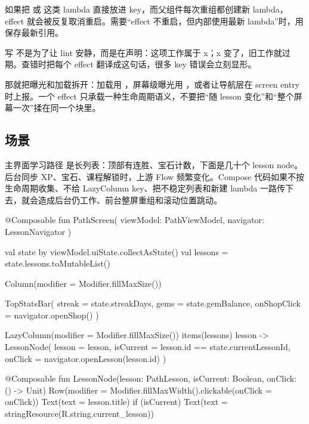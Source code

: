 \begin{pitfall}
如果把  或  这类 lambda 直接放进 key，而父组件每次重组都创建新 lambda，effect 就会被反复取消重启。需要“effect 不重启，但内部使用最新 lambda”时，用  保存最新引用。
\end{pitfall}

\begin{idea}
写  不是为了让 lint 安静，而是在声明：这项工作属于 x；x 变了，旧工作就过期。查错时把每个 effect 翻译成这句话，很多 key 错误会立刻显形。
\end{idea}

\begin{followup}[“如果曝光只想在整个屏幕生命周期内发一次呢？”]
那就把曝光和加载拆开：加载用 ，屏幕级曝光用 ，或者让导航层在 screen entry 时上报。一个 effect 只承载一种生命周期语义，不要把“随 lesson 变化”和“整个屏幕一次”揉在同一个块里。
\end{followup}


\subsection*{场景}
主界面学习路径  是长列表：顶部有连胜、宝石计数，下面是几十个 lesson node。后台同步 XP、宝石、课程解锁时，上游 Flow 频繁变化。Compose 代码如果不按生命周期收集、不给 LazyColumn key、把不稳定列表和新建 lambda 一路传下去，就会造成后台仍工作、前台整屏重组和滚动位置跳动。

\begin{ktbug}
@Composable
fun PathScreen(
    viewModel: PathViewModel,
    navigator: LessonNavigator
) {
    val state by viewModel.uiState.collectAsState()
    val lessons = state.lessons.toMutableList()

    Column(modifier = Modifier.fillMaxSize()) {
        TopStatsBar(
            streak = state.streakDays,
            gems = state.gemBalance,
            onShopClick = { navigator.openShop() }
        )

        LazyColumn(modifier = Modifier.fillMaxSize()) {
            items(lessons) { lesson ->
                LessonNode(
                    lesson = lesson,
                    isCurrent = lesson.id == state.currentLessonId,
                    onClick = { navigator.openLesson(lesson.id) }
                )
            }
        }
    }
}

@Composable
fun LessonNode(lesson: PathLesson, isCurrent: Boolean, onClick: () -> Unit) {
    Row(modifier = Modifier.fillMaxWidth().clickable(onClick = onClick)) {
        Text(text = lesson.title)
        if (isCurrent) Text(text = stringResource(R.string.current_lesson))
    }
}
\end{ktbug}

